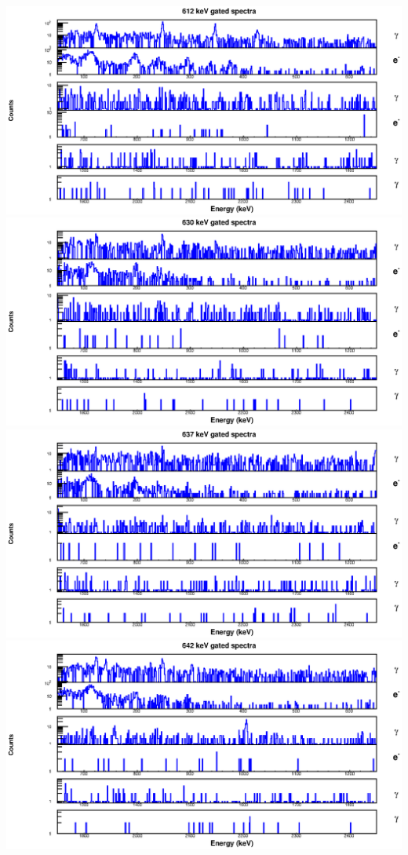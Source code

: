 \begin{landscape}
\includegraphics[scale=1.2]{154Gd_Appendix/612_combined.eps}
\includegraphics[scale=1.2]{154Gd_Appendix/630_combined.eps}
\includegraphics[scale=1.2]{154Gd_Appendix/637_combined.eps}
\includegraphics[scale=1.2]{154Gd_Appendix/642_combined.eps}

\end{landscape}

